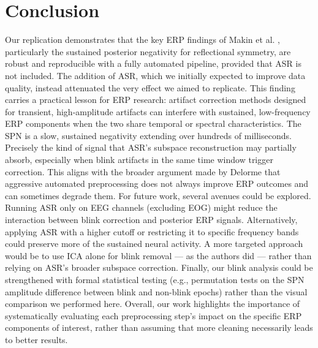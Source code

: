 \documentclass{scrartcl}
\begin{document}
\section{Conclusion}
Our replication demonstrates that the key ERP findings of Makin et al. \cite{paper}, particularly the sustained posterior negativity for reflectional symmetry, are robust and reproducible with a fully automated pipeline, provided that ASR is not included. The addition of ASR, which we initially expected to improve data quality, instead attenuated the very effect we aimed to replicate.
This finding carries a practical lesson for ERP research: artifact correction methods designed for transient, high-amplitude artifacts can interfere with sustained, low-frequency ERP components when the two share temporal or spectral characteristics. The SPN is a slow, sustained negativity extending over hundreds of milliseconds. Precisely the kind of signal that ASR's subspace reconstruction may partially absorb, especially when blink artifacts in the same time window trigger correction. This aligns with the broader argument made by Delorme \cite{leftalone} that aggressive automated preprocessing does not always improve ERP outcomes and can sometimes degrade them.
For future work, several avenues could be explored. Running ASR only on EEG channels (excluding EOG) might reduce the interaction between blink correction and posterior ERP signals. Alternatively, applying ASR with a higher cutoff or restricting it to specific frequency bands could preserve more of the sustained neural activity. A more targeted approach would be to use ICA alone for blink removal — as the authors did — rather than relying on ASR's broader subspace correction. Finally, our blink analysis could be strengthened with formal statistical testing (e.g., permutation tests on the SPN amplitude difference between blink and non-blink epochs) rather than the visual comparison we performed here.
Overall, our work highlights the importance of systematically evaluating each preprocessing step's impact on the specific ERP components of interest, rather than assuming that more cleaning necessarily leads to better results.

\newpage
\printbibliography[
    heading=bibintoc,
    title={References}
]
\end{document}
